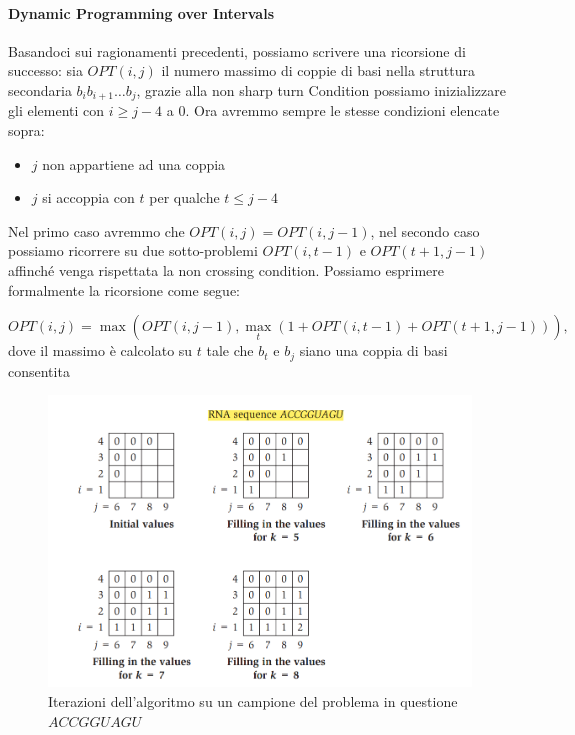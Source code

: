 \paragraph{Dynamic Programming over Intervals}
Basandoci sui ragionamenti precedenti, possiamo scrivere una ricorsione di
successo: sia $OPT(i,j)$ il numero massimo di coppie di basi nella struttura
secondaria $b_i b_{i+1} \ldots b_j$, grazie alla non sharp turn Condition
possiamo inizializzare gli elementi con $i \geq j -4$ a $0$. Ora avremmo sempre
le stesse condizioni elencate sopra:

\begin{itemize}
    \item $j$ non appartiene ad una coppia
    \item $j$ si accoppia con $t$ per qualche $t \leq j - 4$
\end{itemize}

Nel primo caso avremmo che $OPT(i,j) = OPT(i, j-1)$, nel secondo caso possiamo
ricorrere su due sotto-problemi $OPT(i, t-1)$ e $OPT(t+1, j-1)$ affinché venga
rispettata la non crossing condition. Possiamo esprimere formalmente la
ricorsione come segue:

\begin{center}
    \[
        OPT(i, j) = \max(OPT(i, j-1), \max_t(1+OPT(i, t-1)+OPT(t+1, j-1))),
    \]
    dove il massimo è calcolato su $t$ tale che $b_t$ e $b_j$ siano una coppia di
    basi consentita
\end{center}

\begin{figure}[H]
    \centering
    \includegraphics[width=\textwidth, keepaspectratio]{capitoli/imgs/rna_calcolo.png}
    \caption{Iterazioni dell'algoritmo su un campione del problema in questione $ACCGGUAGU$}
\end{figure}
\newpage


